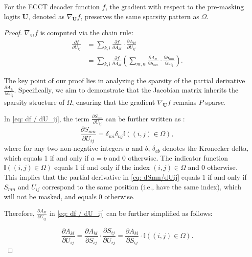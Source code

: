 \documentclass[10pt,a4paper]{amsart}
\begin{document}
\begin{lemma}\label{lemma: the sparsity of gradient df/dU}
    For the ECCT decoder function $f$, the gradient with respect to the pre-masking logits $\mathbf{U}$, denoted as $\nabla_{\mathbf{U}}f$, preserves the same sparsity pattern as $\Omega$.
\end{lemma}

\begin{proof}
$\nabla_{\mathbf{U}}f$ is computed via the chain rule:
\begin{equation}
    \begin{aligned}
    \frac{\partial f}{\partial U_{i j}}&=\sum_{k, l} \frac{\partial f}{\partial A_{k l}} \cdot \frac{\partial A_{k l}}{\partial U_{i j}}\\
    &=\sum_{k, l} \frac{\partial f}{\partial A_{k l}}\left(\sum_{m, n} \frac{\partial A_{k l}}{\partial S_{m n}} \cdot \frac{\partial S_{m n}}{\partial U_{i j}}\right).
    \end{aligned}
    \label{eq: df / dU_ij}
\end{equation}

The key point of our proof lies in analyzing the sparsity of the partial derivative $\frac{\partial A_{k l}}{\partial U_{i j}}$. Specifically, we aim to demonstrate that the Jacobian matrix inherits the sparsity structure of $\Omega$, ensuring that the gradient $\nabla_{\mathbf{U}}f$ remains $P$-sparse.

In \eqref{eq: df / dU_ij}, the term $\frac{\partial S_{m n}}{\partial U_{i j}}$ can be further written as :
\begin{equation}
    \frac{\partial S_{m n}}{\partial U_{i j}} = \delta_{mi} \delta_{nj}\mathbb{I}\left((i,j)\in \Omega \right),
    \label{eq: dSmn/dUij}
\end{equation}
where for any two non-negative integers $a$ and $b$, $\delta_{ab}$ denotes the Kronecker delta, which equals 1 if and only if $a=b$ and 0 otherwise. The indicator function $\mathbb{I}\left((i,j)\in \Omega \right)$ equals 1 if and only if the index $(i,j) \in \Omega$ and 0 otherwise. This implies that the partial derivative in \eqref{eq: dSmn/dUij} equals 1 if and only if $S_{m n}$ and $U_{i j}$ correspond to the same position (i.e., have the same index), which will not be masked, and equals 0 otherwise.

Therefore, $\frac{\partial A_{k l}}{\partial U_{i j}}$ in \eqref{eq: df / dU_ij} can be further simplified as follows:

\begin{equation}
    \frac{\partial A_{k l}}{\partial U_{i j}}=\frac{\partial A_{k l}}{\partial S_{i j}} \cdot \frac{\partial S_{i j}}{\partial U_{i j}}=\frac{\partial A_{k l}}{\partial S_{i j}} \cdot \mathbb{I}((i, j) \in \Omega).
\end{equation}


\end{proof}
\end{document}
